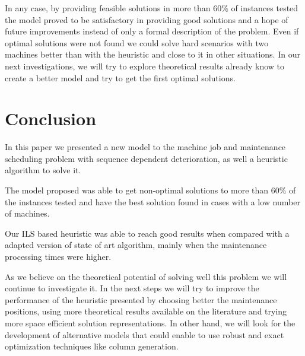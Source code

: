 \documentclass[a4paper,11pt]{article}
\begin{document}
In any case, by providing feasible solutions in more than $60\%$ of instances tested the model proved to be satisfactory in providing good solutions and a hope of future improvements instead of only a formal description of the problem. Even if optimal solutions were not found we could solve hard scenarios with two machines better than with the heuristic and close to it in other situations. In our next investigations, we will try to explore theoretical results already know to create a better model and try to get the first optimal solutions. 
 

\section{Conclusion}

In this paper we presented a new model to the machine job and maintenance scheduling problem with sequence dependent deterioration, as well a heuristic algorithm to solve it. 

The model proposed was able to get non-optimal solutions to more than $60\%$ of the instances tested and have the best solution found in cases with a low number of machines. 

Our ILS based heuristic was able to reach good results when compared with a adapted version of state of art algorithm, mainly when the maintenance processing times were higher. 

As we believe on the theoretical potential of solving well this problem we will continue to investigate it. In the next steps we will try to improve the performance of the heuristic presented by choosing better the maintenance positions, using more theoretical results available on the literature and trying more space efficient solution representations. In other hand, we will look for the development of alternative models that could enable to use robust and exact optimization techniques like column generation. 

 

~\\


\end{document}
